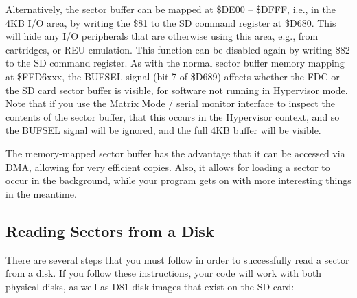 Alternatively, the sector buffer can be mapped at \$DE00 -- \$DFFF,
i.e., in the 4KB I/O area, by writing the \$81 to the SD command
register at \$D680.  This will hide any I/O peripherals that are
otherwise using this area, e.g., from cartridges, or REU emulation.
This function can be disabled again by writing \$82 to the SD command
register. As with the normal sector buffer memory mapping at
\$FFD6xxx, the BUFSEL signal (bit 7 of \$D689) affects whether the FDC
or the SD card sector buffer is visible, for software not running in
Hypervisor mode.  Note that if you use the Matrix Mode / serial monitor
interface to inspect the contents of the sector buffer, that this occurs
in the Hypervisor context, and so the BUFSEL signal will be ignored,
and the full 4KB buffer will be visible.

The memory-mapped sector buffer has the advantage that it can be
accessed via DMA, allowing for very efficient copies.  Also, it allows
for loading a sector to occur in the background, while your program
gets on with more interesting things in the meantime.

\subsection{Reading Sectors from a Disk}

There are several steps that you must follow in order to successfully read
a sector from a disk. If you follow these instructions, your code will work
with both physical disks, as well as D81 disk images that exist on the SD
card:

